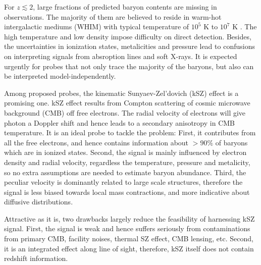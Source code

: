 For $z\lesssim 2$, large fractions of predicted baryon contents are missing in observations.  
The majority of them are believed to reside in warm-hot intergalactic mediums (WHIM) with typical temperature of $10^5$ K to $10^7$ K \cite{Pen1999,Soltan06}. 
The high temperature and low density impose difficulty on direct detection.  
Besides, the uncertainties in ionization states, metalicities and 
pressure  
lead to confusions on interpreting signals from absroption lines 
and soft X-rays. 
It is expected urgently for probes that not only trace the majority of the baryons, but also can be interpreted model-independently.

Among proposed probes, the kinematic Sunyaev-Zel'dovich (kSZ) effect \cite{Sunyaev72,Sunyaev80,Vishniac87} is a promising one.  
kSZ effect results from Compton scattering of cosmic microwave background (CMB) off free electrons. 
The radial velocity of electrons will give photon a Doppler shift 
and hence leads to a 
secondary anisotropy in CMB temperature.
It is an ideal probe to tackle the problem: 
First, it contributes from all 
the free electrons, 
and hence contains information about $>90\%$ of 
baryons which are in ionized states. 
%
Second, the signal is mainly influenced by electron density and radial velocity, 
regardless the temperature, pressure and metalicity,  
so no extra assumptions are needed to estimate baryon abundance.  
%
Third, the peculiar velocity is dominantly related to large scale structures, 
therefore the signal is less biased towards local mass contractions, 
and more indicative about diffusive distributions.  

Attractive as it is, two drawbacks largely reduce the feasibility of harnessing kSZ signal.  
First, the signal is weak 
and hence suffers seriously from contaminations 
from primary CMB, facility noises, 
thermal SZ effect, CMB lensing, etc.  
Second, it is an integrated effect along line of sight, therefore, kSZ itself does not contain redshift information.

